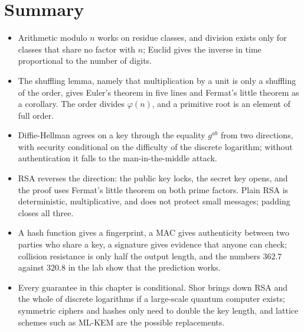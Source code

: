 \section{Summary}
\begin{ringkasan}
\begin{itemize}
    \item Arithmetic modulo $n$ works on residue classes, and division exists only for classes that
        share no factor with $n$; Euclid gives the inverse in time proportional to the number of
        digits.
    \item The shuffling lemma, namely that multiplication by a unit is only a shuffling of the order,
        gives Euler's theorem in five lines and Fermat's little theorem as a corollary. The order
        divides $\varphi(n)$, and a primitive root is an element of full order.
    \item Diffie-Hellman agrees on a key through the equality $g^{ab}$ from two directions, with
        security conditional on the difficulty of the discrete logarithm; without authentication it
        falls to the man-in-the-middle attack.
    \item RSA reverses the direction: the public key locks, the secret key opens, and the proof uses
        Fermat's little theorem on both prime factors. Plain RSA is deterministic, multiplicative, and
        does not protect small messages; padding closes all three.
    \item A hash function gives a fingerprint, a MAC gives authenticity between two parties who share
        a key, a signature gives evidence that anyone can check; collision resistance is only half the
        output length, and the numbers $362.7$ against $320.8$ in the lab show that the prediction
        works.
    \item Every guarantee in this chapter is conditional. Shor brings down RSA and the whole of
        discrete logarithms if a large-scale quantum computer exists; symmetric ciphers and hashes
        only need to double the key length, and lattice schemes such as ML-KEM are the possible
        replacements.
\end{itemize}
\end{ringkasan}

